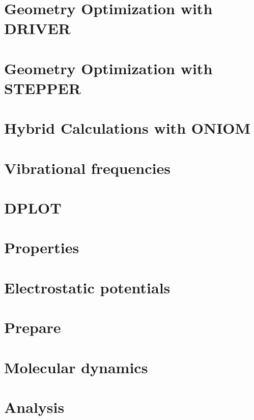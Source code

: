 
\chapter{Geometry Optimization with DRIVER}


\chapter{Geometry Optimization with STEPPER}


\chapter{Hybrid Calculations with ONIOM}


\chapter{Vibrational frequencies}


\chapter{DPLOT}


\chapter{Properties}


\chapter{Electrostatic potentials}


\chapter{Prepare}


\chapter{Molecular dynamics}


\chapter{Analysis}


